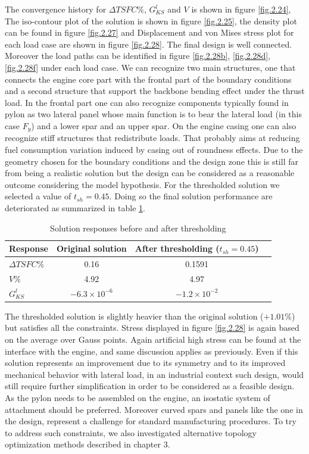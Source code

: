 The convergence history for $\Delta TSFC \%$, $G_{KS}^l$ and $V$ is shown in figure \ref{fig.2.24}, The iso-contour plot of the solution is shown in figure \ref{fig.2.25}, the density plot can be found in figure \ref{fig.2.27} and Displacement and von Mises stress plot for each load case are shown in figure \ref{fig.2.28}. The final design is well connected. Moreover the load paths can be identified in figure \ref{fig.2.28b}, \ref{fig.2.28d}, \ref{fig.2.28f}  under each load case. We can recognize two main structures, one  that connects the engine core part with the frontal part of the boundary conditions and a second structure that support the backbone bending effect under the thrust load. In the frontal part one can also recognize components typically found in pylon as two lateral panel whose main function is to bear the lateral load (in this case $F_y$) and a lower spar and an upper spar. On the engine casing one can also recognize stiff structures that redistribute loads. That probably aims at reducing fuel consumption variation induced by casing out of roundness effects. Due to the geometry chosen for the boundary conditions and the design zone this is still far from being a realistic solution but the design can be considered as a reasonable outcome considering the model hypothesis.  
For the thresholded solution we selected a value of $t_{sh}=0.45$.
  Doing so the final solution performance are deteriorated as summarized in table \ref{tab:table5}.\\
  \begin{table}[h]
         \caption{\label{tab:table5} Solution responses before and after thresholding }
          \centering
          \begin{tabular}{lccc}
          \hline
           Response& Original solution& After thresholding ($t_{sh}=0.45$) \\\hline
         $\Delta TSFC \%$ & 0.16 & 0.1591 \\
         $V \%$ & 4.92 & 4.97 \\
         $G_{KS}^l$ & $-6.3\times 10^{-6}$ & $-1.2\times 10^{-2}$ \\
          \hline
          \end{tabular}
          \end{table}
          The thresholded solution is slightly heavier than the original solution ($+1.01\%$) but satisfies all the constraints. Stress displayed in figure \ref{fig.2.28} is again based on the average over Gauss points. Again artificial high stress can be found at the interface with the engine, and same discussion applies as previously. Even if this solution represents an improvement due to its symmetry and to its improved mechanical behavior with lateral load, in an industrial context such design, would still require further simplification in order to be considered as a feasible design. As the pylon needs to be assembled on the engine, an isostatic system of attachment should be preferred. Moreover curved spars and panels like the one in the design, represent a challenge for standard manufacturing procedures. To try to address such constraints, we also investigated alternative topology optimization methods described in chapter 3.
